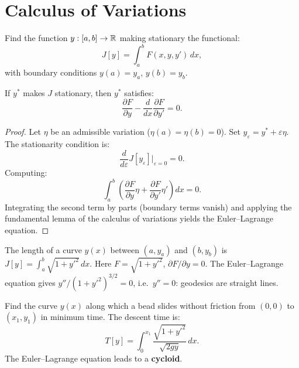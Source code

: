 \section{Calculus of Variations}
\label{sec:variations}

\begin{definition}
Find the function $y:[a,b]\to\mathbb{R}$ making stationary the functional:
\[
  J[y] = \int_a^b F(x,y,y')\,dx,
\]
with boundary conditions $y(a)=y_a$, $y(b)=y_b$.
\end{definition}

\begin{theorem}
If $y^*$ makes $J$ stationary, then $y^*$ satisfies:
\[
  \frac{\partial F}{\partial y}
  - \frac{d}{dx}\frac{\partial F}{\partial y'} = 0.
\]
\end{theorem}

\begin{proof}
Let $\eta$ be an admissible variation ($\eta(a)=\eta(b)=0$).  Set
$y_\varepsilon = y^* + \varepsilon\eta$.  The stationarity condition
is:
\[
  \frac{d}{d\varepsilon}J[y_\varepsilon]\bigg|_{\varepsilon=0} = 0.
\]
Computing:
\[
  \int_a^b\left(\frac{\partial F}{\partial y}\eta
  + \frac{\partial F}{\partial y'}\eta'\right)dx = 0.
\]
Integrating the second term by parts (boundary terms vanish) and
applying the fundamental lemma of the calculus of variations yields
the Euler--Lagrange equation.
\end{proof}

\begin{example}
The length of a curve $y(x)$ between $(a,y_a)$ and $(b,y_b)$ is
$J[y]=\int_a^b\sqrt{1+y'^2}\,dx$.  Here $F=\sqrt{1+y'^2}$,
$\partial F/\partial y=0$.  The Euler--Lagrange equation gives
$y''/(1+y'^2)^{3/2}=0$, i.e.\ $y''=0$: geodesics are straight
lines.
\end{example}

\begin{example}[Brachistochrone]
Find the curve $y(x)$ along which a bead slides without friction
from $(0,0)$ to $(x_1,y_1)$ in minimum time.  The descent time is:
\[
  T[y] = \int_0^{x_1}\frac{\sqrt{1+y'^2}}{\sqrt{2gy}}\,dx.
\]
The Euler--Lagrange equation leads to a \textbf{cycloid}.
\end{example}

